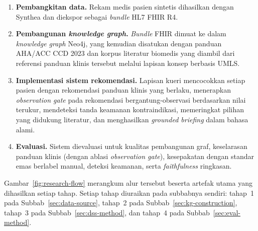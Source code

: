 \begin{enumerate}
    \item \textbf{Pembangkitan data.} Rekam medis pasien sintetis dihasilkan dengan Synthea
    dan diekspor sebagai \emph{bundle} HL7 FHIR R4.
    \item \textbf{Pembangunan \emph{knowledge graph}.} \emph{Bundle} FHIR dimuat ke dalam
    \emph{knowledge graph} Neo4j, yang kemudian disatukan dengan panduan AHA/ACC CCD 2023 dan
    korpus literatur biomedis yang diambil dari referensi panduan klinis tersebut melalui lapisan konsep
    berbasis UMLS.
    \item \textbf{Implementasi sistem rekomendasi.} Lapisan kueri mencocokkan setiap pasien
    dengan rekomendasi panduan klinis yang berlaku, menerapkan \emph{observation gate} pada
    rekomendasi bergantung-observasi berdasarkan nilai terukur, mendeteksi tanda keamanan
    kontraindikasi, memeringkat pilihan yang didukung literatur, dan menghasilkan
    \emph{grounded briefing} dalam bahasa alami.
    \item \textbf{Evaluasi.} Sistem dievaluasi untuk kualitas pembangunan graf, keselarasan
    panduan klinis (dengan ablasi \emph{observation gate}), kesepakatan dengan standar emas berlabel
    manual, deteksi keamanan, serta \emph{faithfulness} ringkasan.
\end{enumerate}

Gambar~\ref{fig:research-flow} merangkum alur tersebut beserta artefak utama yang dihasilkan
setiap tahap. Setiap tahap diuraikan pada subbabnya sendiri: tahap~1 pada
Subbab~\ref{sec:data-source}, tahap~2 pada Subbab~\ref{sec:kg-construction}, tahap~3 pada
Subbab~\ref{sec:dss-method}, dan tahap~4 pada Subbab~\ref{sec:eval-method}.

